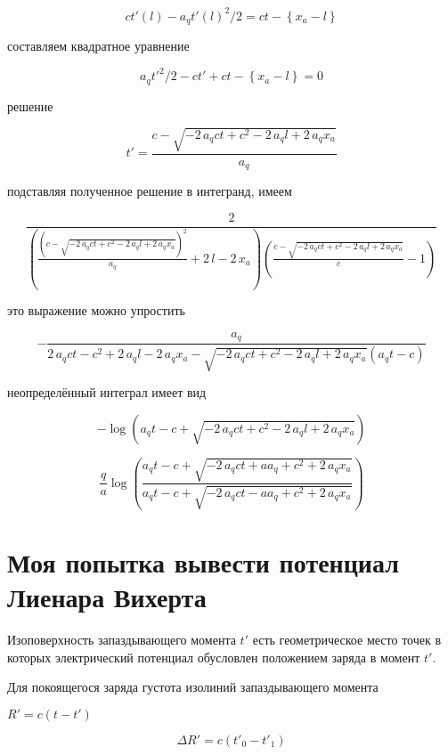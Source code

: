 \documentclass{article}
\begin{document}
$$ c t'(l) - a_q {t'(l)}^{2} / 2 = c t - \left\{x_a -  l\right\}$$

составляем квадратное уравнение

$$ a_q {t'}^{2} / 2 -c t'  + c t - \left\{x_a -  l\right\} = 0$$



решение


$$t' = \frac{c - \sqrt{-2 \, a_{q} c t + c^{2} - 2 \, a_{q} l + 2 \, a_{q} x_{a}}}{a_{q}}$$

подставляя полученное решение в интегранд, имеем

$$\frac{2}{{\left(\frac{{\left(c - \sqrt{-2 \, a_{q} c t + c^{2} - 2 \, a_{q} l + 2 \, a_{q} x_{a}}\right)}^{2}}{a_{q}} + 2 \, l - 2 \, x_{a}\right)} {\left(\frac{c - \sqrt{-2 \, a_{q} c t + c^{2} - 2 \, a_{q} l + 2 \, a_{q} x_{a}}}{c} - 1\right)}}$$

это выражение можно упростить

$$-\frac{a_{q}}{2 \, a_{q} c t - c^{2} + 2 \, a_{q} l - 2 \, a_{q} x_{a} - \sqrt{-2 \, a_{q} c t + c^{2} - 2 \, a_{q} l + 2 \, a_{q} x_{a}} {\left(a_{q} t - c\right)}}$$

неопределённый интеграл имеет вид

$$-\log\left(a_{q} t - c + \sqrt{-2 \, a_{q} c t + c^{2} - 2 \, a_{q} l + 2 \, a_{q} x_{a}}\right)$$



$$\frac{q}{a} \log\left(\frac{a_{q} t - c + \sqrt{-2 \, a_{q} c t + a a_{q} + c^{2} + 2 \, a_{q} x_{a}}}{a_{q} t - c + \sqrt{-2 \, a_{q} c t - a a_{q} + c^{2} + 2 \, a_{q} x_{a}}}\right)$$

\section{Моя попытка вывести потенциал Лиенара Вихерта}

Изоповерхность запаздывающего момента $t'$ есть геометрическое место точек в которых электрический потенциал обусловлен положением заряда в момент $t'$. 


Для покоящегося заряда густота изолиний запаздывающего момента

$R'=c(t-t')$

$$\Delta R' = c(t'_{0} -t'_{1})$$
\end{document}

